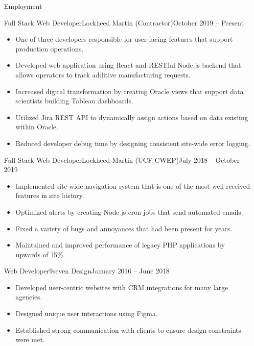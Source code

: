 \documentclass[calibri]{mcdowellcv}
\begin{document}
	\makeheader
	
	\begin{cvsection}{Employment}
		\begin{cvsubsection}{Full Stack Web Developer}{Lockheed Martin (Contractor)}{October 2019 -- Present}		
			\begin{itemize}
				\item One of three developers responsible for user-facing features that support production operations.
				\item Developed web application using React and RESTful Node.js backend that allows operators to track additive manufacturing requests.
				\item Increased digital transformation by creating Oracle views that support data scientists building Tableau dashboards.
				\item Utilized Jira REST API to dynamically assign actions based on data existing within Oracle.
				\item Reduced developer debug time by designing consistent site-wide error logging.
			\end{itemize}
		\end{cvsubsection}
		
		\begin{cvsubsection}{Full Stack Web Developer}{Lockheed Martin (UCF CWEP)}{July 2018 -- October 2019}	
			\begin{itemize}
				\item Implemented site-wide navigation system that is one of the most well received features in site history.
				\item Optimized alerts by creating Node.js cron jobs that send automated emails.
				\item Fixed a variety of bugs and annoyances that had been present for years.
				\item Maintained and improved performance of legacy PHP applications by upwards of 15\%.
			\end{itemize}
		\end{cvsubsection}
		
		\begin{cvsubsection}{Web Developer}{9seven Design}{January 2016 -- June 2018}		
			\begin{itemize}
				\item Developed user-centric websites with CRM integrations for many large agencies.
				\item Designed unique user interactions using Figma.
				\item Established strong communication with clients to ensure design constraints were met.
			\end{itemize}
		\end{cvsubsection}
	\end{cvsection}
	
\end{document}
